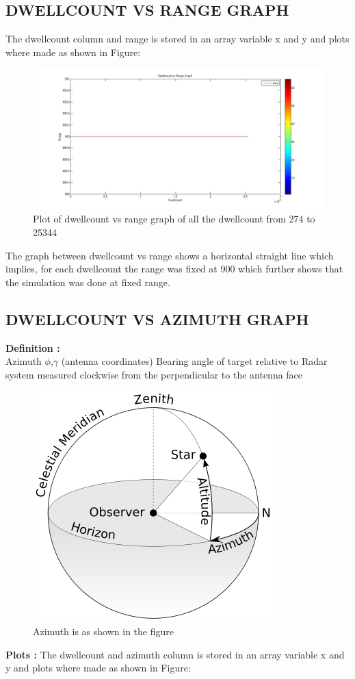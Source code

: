 \documentclass[14pt]{article} %
\begin{document}
\subsection{DWELLCOUNT VS RANGE GRAPH}
The dwellcount column   and range is stored in an array variable x and y and plots where made as shown in Figure:
 \begin{figure}[H]
\includegraphics[width=\linewidth]{dwellcount-range(1,25067).jpg}
  \caption{Plot of dwellcount vs range graph of all the dwellcount from 274 to 25344}
  \label{fig:figure 28}
  \end{figure}
  \begin{tcolorbox}[title =\textbf{Analysis}]
  The graph between dwellcount vs range shows a horizontal straight line which implies, for each dwellcount the range was fixed at 900 which further shows that the simulation was done at fixed range.
  \end{tcolorbox}
  \subsection{DWELLCOUNT VS AZIMUTH GRAPH}
  \noindent \textbf{Definition : }\\
   \indent Azimuth $\phi$,$\gamma$ (antenna coordinates) Bearing angle of target relative to Radar system measured clockwise from the perpendicular to the antenna face 
   \begin{figure}[H]
   \centering
\includegraphics[width=0.4\linewidth]{azimuth.png}
  \caption{Azimuth is as shown in the figure}
  \label{fig:figure 29}
  \end{figure}
  \noindent \textbf{Plots : }The dwellcount and azimuth column is stored in an array variable x and y and plots where made as shown in Figure:
\end{document}
